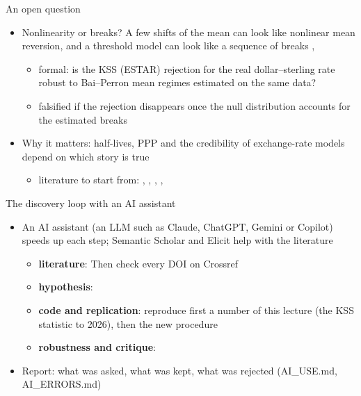 \begin{frame}{An open question}
\itemsize{\small}
\begin{itemize}
    \item Nonlinearity or breaks? A few shifts of the mean can look like nonlinear mean reversion, and a threshold model can look like a sequence of breaks , 
    \begin{itemize}
        \item formal: is the KSS (ESTAR) rejection for the real dollar--sterling rate robust to Bai--Perron mean regimes estimated on the same data?
        \item falsified if the rejection disappears once the null distribution accounts for the estimated breaks
    \end{itemize}
    \item Why it matters: half-lives, PPP and the credibility of exchange-rate models depend on which story is true
    \begin{itemize}
        \item literature to start from: , , , , 
    \end{itemize}
\end{itemize}
\end{frame}

\begin{frame}{The discovery loop with an AI assistant}
\itemsize{\footnotesize}
\begin{itemize}
    \item An AI assistant (an LLM such as Claude, ChatGPT, Gemini or Copilot) speeds up each step; Semantic Scholar and Elicit help with the literature
    \begin{itemize}
        \item \textbf{literature}:  Then check every DOI on Crossref
        \item \textbf{hypothesis}: 
        \item \textbf{code and replication}: reproduce first a number of this lecture (the KSS statistic to 2026), then the new procedure
        \item \textbf{robustness and critique}: 
    \end{itemize}
    \item Report: what was asked, what was kept, what was rejected (AI\_USE.md, AI\_ERRORS.md)
\end{itemize}
\end{frame}

